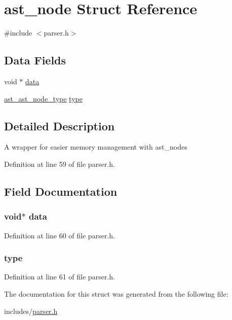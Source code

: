 \hypertarget{structast__node}{\section{ast\+\_\+node Struct Reference}
\label{structast__node}
}


{\ttfamily \#include $<$parser.\+h$>$}

\subsection*{Data Fields}
\begin{DoxyCompactItemize}
\item 
void $\ast$ \hyperlink{structast__node_a735984d41155bc1032e09bece8f8d66d}{data}
\item 
\hyperlink{parser_8h_a7650f648edfc83857f6600e1898e7cac}{ast\+\_\+ast\+\_\+node\+\_\+type} \hyperlink{structast__node_a25e8b555394f35ce17b998d5271ef1d3}{type}
\end{DoxyCompactItemize}


\subsection{Detailed Description}
A wrapper for easier memory management with ast\+\_\+nodes 

Definition at line 59 of file parser.\+h.



\subsection{Field Documentation}
\hypertarget{structast__node_a735984d41155bc1032e09bece8f8d66d}{
\subsubsection[{data}]{\setlength{\rightskip}{0pt plus 5cm}void$\ast$ data}}\label{structast__node_a735984d41155bc1032e09bece8f8d66d}


Definition at line 60 of file parser.\+h.

\hypertarget{structast__node_a25e8b555394f35ce17b998d5271ef1d3}{
\subsubsection[{type}]{ type}}\label{structast__node_a25e8b555394f35ce17b998d5271ef1d3}


Definition at line 61 of file parser.\+h.



The documentation for this struct was generated from the following file\+:\begin{DoxyCompactItemize}
\item 
includes/\hyperlink{parser_8h}{parser.\+h}\end{DoxyCompactItemize}
